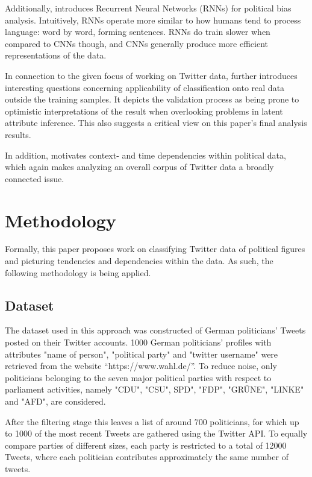 \documentclass[10pt, oneside]{article}
\begin{document}
\begin{multicols}{2}
Additionally, \cite{Misra2016} introduces Recurrent Neural Networks (RNNs) for political bias analysis. Intuitively, RNNs operate more similar to how humans tend to process language: word by word, forming sentences. RNNs do train slower when compared to CNNs though, and CNNs generally produce more efficient representations of the data.

In connection to the given focus of working on Twitter data, \cite{Cohen2013} further introduces interesting questions concerning applicability of classification onto real data outside the training samples. It depicts the validation process as being prone to optimistic interpretations of the result when overlooking problems in latent attribute inference. This also suggests a critical view on this paper's final analysis results. 

In addition, \cite{SuggestedAdditionalResource2018} motivates context- and time dependencies within political data, which again makes analyzing an overall corpus of Twitter data a broadly connected issue.


\section{Methodology}

Formally, this paper proposes work on classifying Twitter data of political figures and picturing tendencies and dependencies within the data. As such, the following methodology is being applied. 

\subsection{Dataset} 

The dataset used in this approach was constructed of German politicians' Tweets posted on their Twitter accounts. 1000 German politicians' profiles with attributes "name of person", "political party" and "twitter username" were retrieved from the website “https://www.wahl.de/”.
To reduce noise, only politicians belonging to the seven major political parties with respect to parliament activities, namely "CDU", "CSU", SPD", "FDP", "GRÜNE", "LINKE" and "AFD", are considered.

After the filtering stage this leaves a list of around 700 politicians, for which up to 1000 of the most recent Tweets are  gathered using the Twitter API. To equally compare parties of different sizes, each party is restricted to a total of 12000 Tweets, where each politician contributes approximately the same number of tweets.


\end{multicols}
\end{document}
